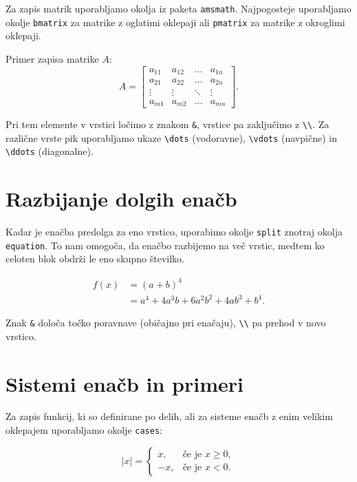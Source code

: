 \documentclass[a4paper,12pt,openright]{book}
\begin{document}
Za zapis matrik uporabljamo okolja iz paketa \texttt{amsmath}. Najpogosteje uporabljamo okolje \texttt{bmatrix} za matrike z oglatimi oklepaji ali \texttt{pmatrix} za matrike z okroglimi oklepaji.

Primer zapisa matrike $A$:
\begin{equation}
    A = \begin{bmatrix}
        a_{11} & a_{12} & \dots  & a_{1n} \\
        a_{21} & a_{22} & \dots  & a_{2n} \\
        \vdots & \vdots & \ddots & \vdots \\
        a_{m1} & a_{m2} & \dots  & a_{mn}
    \end{bmatrix}.
\end{equation}

Pri tem elemente v vrstici ločimo z znakom \texttt{\&}, vrstice pa zaključimo z \texttt{\textbackslash\textbackslash}. Za različne vrste pik uporabljamo ukaze \verb|\dots| (vodoravne), \verb|\vdots| (navpične) in \verb|\ddots| (diagonalne).

\section{Razbijanje dolgih enačb}

Kadar je enačba predolga za eno vrstico, uporabimo okolje \texttt{split} znotraj okolja \texttt{equation}. To nam omogoča, da enačbo razbijemo na več vrstic, medtem ko celoten blok obdrži le eno skupno številko.

\begin{equation}
    \begin{split}
        f(x) &= (a+b)^4 \\
             &= a^4 + 4a^3b + 6a^2b^2 + 4ab^3 + b^4.
    \end{split}
    \label{eq:razcep}
\end{equation}

Znak \texttt{\&} določa točko poravnave (običajno pri enačaju), \texttt{\textbackslash\textbackslash} pa prehod v novo vrstico.

\section{Sistemi enačb in primeri}

Za zapis funkcij, ki so definirane po delih, ali za sisteme enačb z enim velikim oklepajem uporabljamo okolje \texttt{cases}:

\begin{equation}
    |x| = \begin{cases}
        x,  & \text{če je } x \ge 0, \\
        -x, & \text{če je } x < 0.
    \end{cases}
\end{equation}
\end{document}
